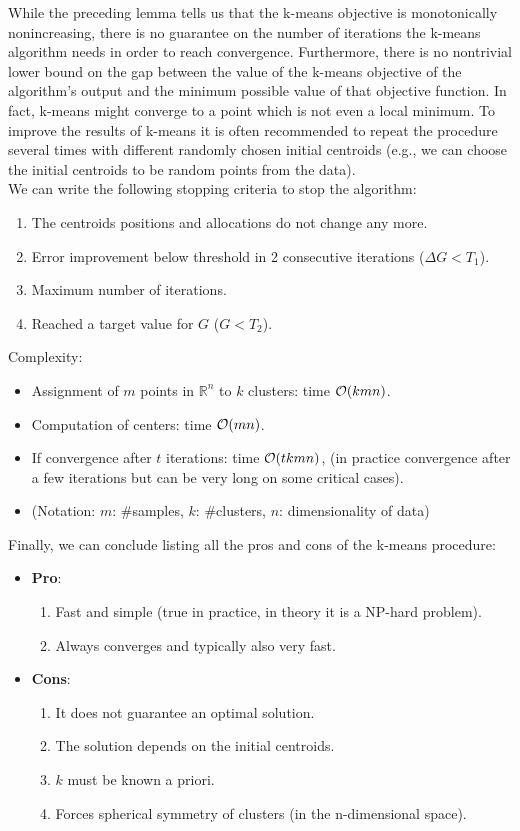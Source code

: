 \documentclass[12pt]{report}
\theoremstyle{plain}
\begin{document}
\begin{flushleft}
While the preceding lemma tells us that the k-means objective is monotonically nonincreasing, there is no guarantee on the number of iterations the k-means algorithm needs in order to reach convergence. Furthermore, there is no nontrivial lower bound on the gap between the value of the k-means objective of the algorithm’s output and the minimum possible value of that objective function. In fact, k-means might converge to a point which is not even a local minimum. To improve the results of k-means it is often recommended to repeat the procedure several times with different randomly chosen initial centroids (e.g., we can choose the initial centroids to be random points from the data).\\
We can write the following stopping criteria to stop the algorithm:
\begin{enumerate}
	\item The centroids positions and allocations do not change any more.
	\item Error improvement below threshold in 2 consecutive iterations ($\Delta G<T_1$).
	\item Maximum number of iterations.
	\item Reached a target value for $G$ ($G<T_2$).
\end{enumerate}
Complexity:
\begin{itemize}
	\item Assignment of $m$ points in $\mathds{R}^n$ to $k$ clusters: time $\order{kmn}$.
	\item Computation of centers: time $\order{mn}$.
	\item If convergence after $t$ iterations: time $\order{tkmn}$, (in practice convergence after a few iterations but can be very long on some	critical cases).
	\item[] (Notation: $m$: \#samples, $k$: \#clusters, $n$: dimensionality of data)
\end{itemize}
Finally, we can conclude listing all the pros and cons of the k-means procedure:
\begin{itemize}
	\item \textbf{Pro}:
	\begin{enumerate}
		\item Fast and simple (true in practice, in theory it is a NP-hard problem).
		\item Always converges and typically also very fast.
	\end{enumerate}
	\item \textbf{Cons}:
	\begin{enumerate}
		\item It does not guarantee an optimal solution.
		\item The solution depends on the initial centroids.
		\item $k$ must be known a priori.
		\item Forces spherical symmetry of clusters (in the n-dimensional space).
	\end{enumerate}
\end{itemize}




\end{flushleft}
\end{document}
